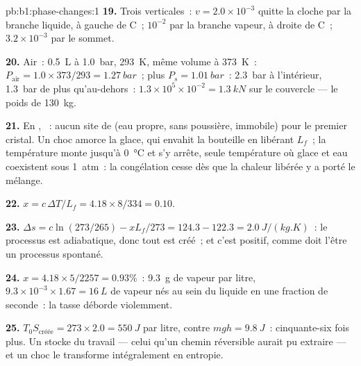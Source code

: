 \begin{solution}{pb:b1:phase-changes:1}
\textbf{19.} Trois verticales~: $v = 2.0 \times 10^{-3}$ quitte la cloche par la
branche liquide, à gauche de C~; $10^{-2}$ par la branche vapeur, à droite de
C~; $3.2 \times 10^{-3}$ par le sommet.

\textbf{20.} Air~: \qty{0.5}{L} à \qty{1.0}{bar}, \qty{293}{K}, même volume à
\qty{373}{K}~: $P_{\text{air}} = 1.0 \times 373/293 = \qty{1.27}{bar}$~; plus
$P_s = \qty{1.01}{bar}$~: \qty{2.3}{bar} à l'intérieur, \qty{1.3}{bar} de plus
qu'au-dehors~: $1.3 \times 10^5 \times 10^{-2} = \qty{1.3}{kN}$ sur le couvercle
--- le poids de \qty{130}{kg}.

\textbf{21.} En , ~: aucun site de  (eau
propre, sans poussière, immobile) pour le premier cristal. Un choc amorce la
glace, qui envahit la bouteille en libérant $L_f$~; la température monte
jusqu'à \qty{0}{\degreeCelsius} et s'y arrête, seule température où glace et
eau coexistent sous \qty{1}{atm}~: la congélation cesse dès que la chaleur
libérée y a porté le mélange.

\textbf{22.} $x = c\,\Delta T/L_f = 4.18 \times 8/334 = 0.10$.

\textbf{23.} $\Delta s = c\ln(273/265) - xL_f/273 = 124.3 - 122.3 =
\qty{+2.0}{J/(kg.K)}$~: le processus est adiabatique, donc tout est créé~; et
c'est positif, comme doit l'être un processus spontané.

\textbf{24.} $x = 4.18 \times 5/2257 = 0.93\%$~: \qty{9.3}{g} de vapeur par litre,
$9.3 \times 10^{-3} \times 1.67 = \qty{16}{L}$ de vapeur nés au sein du liquide en
une fraction de seconde~: la tasse déborde violemment.

\textbf{25.} $T_0S_{\text{créée}} = 273 \times 2.0 = \qty{550}{J}$ par litre,
contre $mgh = \qty{9.8}{J}$~: cinquante-six fois plus. Un  stocke
du travail --- celui qu'un chemin réversible aurait pu extraire --- et un choc
le transforme intégralement en entropie.
\end{solution}
